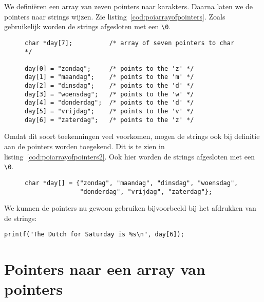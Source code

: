 We definiëren een array van zeven pointers naar karakters. Daarna laten we de pointers naar strings wijzen. Zie listing~\ref{cod:poiarrayofpointers}. Zoals gebruikelijk worden de strings afgesloten met een \lstinline|\0|.

\begin{figure}[!ht]
\begin{lstlisting}[caption=Een array van pointers.,label=cod:poiarrayofpointers]
char *day[7];          /* array of seven pointers to char */

day[0] = "zondag";     /* points to the 'z' */
day[1] = "maandag";    /* points to the 'm' */
day[2] = "dinsdag";    /* points to the 'd' */
day[3] = "woensdag";   /* points to the 'w' */
day[4] = "donderdag";  /* points to the 'd' */
day[5] = "vrijdag";    /* points to the 'v' */
day[6] = "zaterdag";   /* points to the 'z' */
\end{lstlisting}
\end{figure}

Omdat dit soort toekenningen veel voorkomen, mogen de strings ook bij definitie aan de pointers worden toegekend. Dit is te zien in listing~\ref{cod:poiarrayofpointers2}. Ook hier worden de strings afgesloten met een \lstinline|\0|.

\begin{figure}[!ht]
\begin{lstlisting}[caption=Een array van pointers naar strings met initialisatie.,label=cod:poiarrayofpointers2]
char *day[] = {"zondag", "maandag", "dinsdag", "woensdag",
               "donderdag", "vrijdag", "zaterdag"};
\end{lstlisting}
\end{figure}

We kunnen de pointers nu gewoon gebruiken bijvoorbeeld bij het afdrukken van de strings:

\begin{lstlisting}[style=lstoneline]
printf("The Dutch for Saturday is %s\n", day[6]);
\end{lstlisting}



\section{Pointers naar een array van pointers}
\label{sec:pointersnaareenarrayvanpointers}

